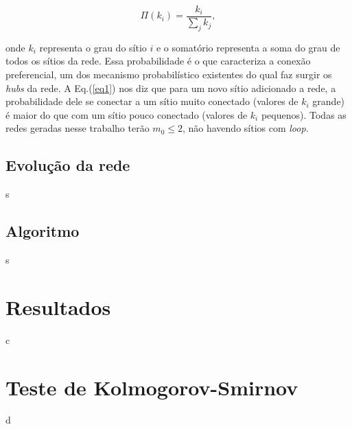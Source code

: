 \documentclass[10pt,a4paper]{article}
\begin{document}
\begin{equation}
    \label{eq1}
    \Pi(k_i) = \frac{k_i}{\sum_j k_j},
\end{equation}

onde $k_i$ representa o grau do sítio $i$ e o somatório representa a soma do grau de todos os sítios da rede. Essa probabilidade é o que caracteriza a conexão preferencial, um dos mecanismo probabilístico existentes do qual faz surgir os {\it hubs} da rede. A Eq.(\ref{eq1}) nos diz que para um novo sítio adicionado a rede, a probabilidade dele se conectar a um sítio muito conectado (valores de $k_i$ grande) é maior do que com um sítio pouco conectado (valores de $k_i$ pequenos). Todas as redes geradas nesse trabalho terão $m_0 \le 2$, não havendo sítios com {\it loop}.

\subsection{Evolução da rede}

s

\subsection{Algoritmo}

s





\section{Resultados}
c

\section{Teste de Kolmogorov-Smirnov}
d

\printbibliography
\end{document}
